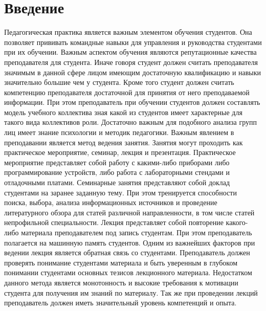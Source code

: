 \documentclass
[   twoside=false,    
    fontsize=14pt,     
    DIV=15,           
    BCOR=17mm,         
    headsepline, 
    footsepline, 
    open=right,        
    paper=a4,          
    abstract=true,     
    listof=totoc,     
    bibliography=totoc,
    titlepage,       
    headinclude=true,  
    footinclude=false, 
    numbers=noenddot   
]   {scrreprt}      %
\begin{document}
\begin{singlespace}

\end{singlespace}
\onehalfspace
{} %
\pagestyle{scrheadings} %
\tableofcontents
\newpage
\chapter{Введение}
Педагогическая практика является важным элементом обучения студентов. Она позволяет прививать командные навыки для управления и руководства студентами при их обучении. Важным аспектом обучения являются репутационные качества преподавателя для студента. Иначе говоря студент должен считать преподавателя значимым в данной сфере лицом имеющим достаточную квалификацию и навыки значительно большие чем у студента. Кроме того студент должен считать компетенцию преподавателя достаточной для принятия от него преподаваемой информации.  При этом преподаватель при обучении студентов должен составлять модель учебного коллектива зная какой из студентов имеет характерные для такого вида коллективов роли.
 Достаточно важным для подобного анализа групп лиц имеет знание психологии и методик педагогики. Важным явлением в преподавании является метод ведения занятия. Занятия могут проходить как практическое мероприятие, семинар, лекция и презентация. 
Практическое мероприятие представляет собой работу с какими-либо приборами либо программирование устройств, либо работа с лабораторными стендами и отладочными платами. 	
Семинарные занятия представляют собой доклад студентами на заранее заданную тему. При этом тренируется способности поиска, выбора, анализа информационных источников и проведение литературного обзора для статей различной направленности, в том числе статей непрофильной специальности. 	Лекция представляет собой повторение какого-либо материала преподавателем под запись студентам. При этом преподаватель полагается на машинную память студентов. Одним из важнейших факторов при ведении лекция является обратная связь со студентами. Преподаватель должен проверять понимание студентами материала и быть уверенным в глубоком понимании студентами основных тезисов лекционного материала. Недостатком данного метода является монотонность и высокие требования к мотивации студента для получения им знаний по материалу. Так же при проведении лекций преподаватель должен иметь значительный уровень компетенций и опыта. 
\end{document}

